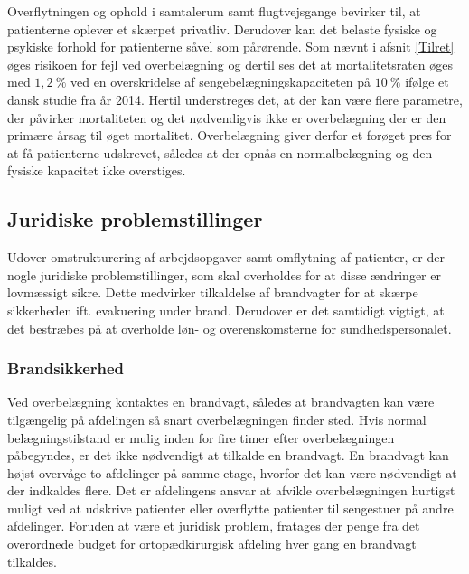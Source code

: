 \noindet
Overflytningen og ophold i samtalerum samt flugtvejsgange bevirker til, at patienterne oplever et skærpet privatliv. \cite{Madsen2014} Derudover kan det belaste fysiske og psykiske forhold for patienterne såvel som pårørende. \cite{Heidmann2014} Som nævnt i afsnit \ref{Tilret} øges risikoen for fejl ved overbelægning og dertil ses det at mortalitetsraten øges med $1,2~\%$ ved en overskridelse af sengebelægningskapaciteten på $10~\%$ ifølge et dansk studie fra år 2014. \cite{Madsen2014} Hertil understreges det, at der kan være flere parametre, der påvirker mortaliteten og det nødvendigvis ikke er overbelægning der er den primære årsag til øget mortalitet. Overbelægning giver derfor et forøget pres for at få patienterne udskrevet, således at der opnås en normalbelægning og  den fysiske kapacitet ikke overstiges.  

 
\subsection{Juridiske problemstillinger}
Udover omstrukturering af arbejdsopgaver samt omflytning af patienter, er der nogle juridiske problemstillinger, som skal overholdes for at disse ændringer er lovmæssigt sikre. Dette medvirker tilkaldelse af brandvagter for at skærpe sikkerheden ift. evakuering under brand. Derudover er det samtidigt vigtigt, at det bestræbes på at overholde løn- og overenskomsterne for sundhedspersonalet.

\subsubsection{Brandsikkerhed}
Ved overbelægning kontaktes en brandvagt, således at brandvagten kan være tilgængelig på afdelingen så snart overbelægningen finder sted. Hvis normal belægningstilstand er mulig inden for fire timer efter overbelægningen påbegyndes, er det ikke nødvendigt at tilkalde en brandvagt. En brandvagt kan højst overvåge to afdelinger på samme etage, hvorfor det kan være nødvendigt at der indkaldes flere. Det er afdelingens ansvar at afvikle overbelægningen hurtigst muligt ved at udskrive patienter eller overflytte patienter til sengestuer på andre afdelinger. \cite{Beredskab2016} Foruden at være et juridisk problem, fratages der penge fra det overordnede budget for ortopædkirurgisk afdeling hver gang en brandvagt tilkaldes.  

